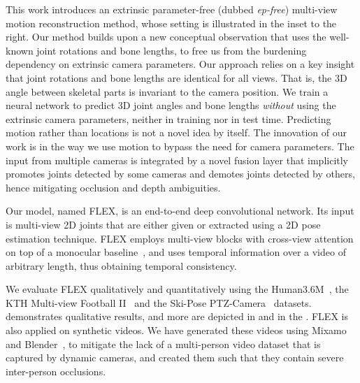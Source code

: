 This work introduces an extrinsic parameter-free (dubbed \emph{ep-free}) multi-view motion reconstruction method, whose setting is illustrated in the inset to the right. 
%
Our method builds upon a new conceptual observation that uses the well-known joint rotations and bone lengths, to free us from the burdening dependency on extrinsic camera parameters.
%
Our approach relies on a key insight that joint rotations and bone lengths are identical for all views. 
That is, the 3D angle between skeletal parts is invariant to the camera position.
%
We train a neural network to predict 3D joint angles and bone lengths \emph{without} using the extrinsic camera parameters, 
neither in training nor in test time.
Predicting motion rather than locations is not a novel idea by itself. The innovation of our work is in the way we use motion to bypass the need for camera parameters.
The input from multiple cameras is integrated by a novel fusion layer that implicitly promotes joints detected by some cameras and demotes joints detected by others, 
hence  mitigating occlusion and depth ambiguities.

Our model, named FLEX, is an end-to-end deep convolutional network. Its input is multi-view 2D joints that are either given or extracted using a 2D pose estimation technique. 
FLEX employs multi-view blocks with cross-view attention on top of a monocular baseline~\cite{shi2020motionet}, 
and 
uses temporal information over a video of arbitrary length, thus obtaining temporal consistency.


We evaluate FLEX qualitatively and quantitatively using the Human3.6M~\cite{h36m_pami,IonescuSminchisescu11}, the KTH Multi-view Football II~\cite{footballDS} and the Ski-Pose PTZ-Camera~\cite{ski_ptz} datasets. 
 demonstrates qualitative results, and more are depicted in  and in the \fi.
%
FLEX is also applied on synthetic videos. We have generated these videos using Mixamo~ and Blender~,  to mitigate the lack of a multi-person video dataset that is captured by dynamic cameras, and created them such that they contain severe inter-person occlusions.

